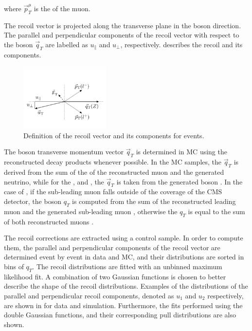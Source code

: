 where $\vec{p}_{T}^{\mu}$ is the \pt of the muon.

The recoil vector is projected along the transverse plane in the boson direction. The parallel and perpendicular components of the recoil vector with respect to the boson $\vec{q}_{T}$ are labelled as $u_{\parallel}$ and $u_{\perp}$, respectively.  describes the recoil and its components.

\begin{figure}
 \begin{center}
  \includegraphics[width=0.4\textwidth]{Figures/WBoson/Analysis/Correction/Recoil/Recoil_Definition.pdf}
  \caption{Definition of the recoil vector and its components for \ZToMuMu events.}
  \label{fig:RecoilDefinition}
 \end{center}
\end{figure}
 
The boson transverse momentum vector $\vec{q}_{T}$ is determined in MC using the reconstructed decay products whenever possible. In the \WToMuNu MC samples, the $\vec{q}_{T}$ is derived from the sum of the \pt of the reconstructed muon and the generated neutrino, while for the \WToTauNu, \DYToTauTau and \ttbar, the $\vec{q}_{T}$ is taken from the generated boson \pt. In the case of \DYToMuMu, if the sub-leading muon falls outside of the coverage of the CMS detector, the \Z boson $q_{T}$ is computed from the sum of the reconstructed leading muon \pt and the generated sub-leading muon \pt, otherwise the $q_{T}$ is equal to the sum of both reconstructed muons \pt.

The recoil corrections are extracted using a \Z control sample. In order to compute them, the parallel and perpendicular components of the recoil vector are determined event by event in data and MC, and their distributions are sorted in bins of $q_{T}$. The recoil distributions are fitted with an unbinned maximum likelihood fit. A combination of two Gaussian functions is chosen to better describe the shape of the recoil distributions. Examples of the distributions of the parallel and perpendicular recoil components, denoted as $u_{1}$ and $u_{2}$ respectively, are shown in  for data and simulation. Furthermore, the fits performed using the double Gaussian functions, and their corresponding pull distributions are also shown.

